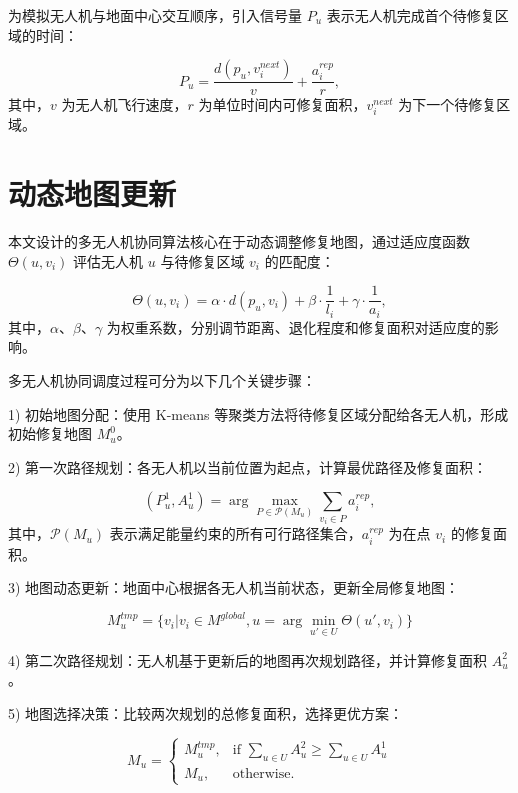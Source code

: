 为模拟无人机与地面中心交互顺序，引入信号量 $P_u$ 表示无人机完成首个待修复区域的时间：

\begin{equation}
	P_u = \frac{d(p_u, v_i^{next})}{v} + \frac{a_i^{rep}}{r},
\end{equation}
其中，$v$ 为无人机飞行速度，$r$ 为单位时间内可修复面积，$v_i^{next}$ 为下一个待修复区域。

\section{动态地图更新}

本文设计的多无人机协同算法核心在于动态调整修复地图，通过适应度函数 $\Theta(u,v_i)$ 评估无人机 $u$ 与待修复区域 $v_i$ 的匹配度：

\begin{equation}
	\Theta(u,v_i) = \alpha \cdot d(p_u, v_i) + \beta \cdot \frac{1}{l_i} + \gamma \cdot \frac{1}{a_i},
\end{equation}
其中，$\alpha$、$\beta$、$\gamma$ 为权重系数，分别调节距离、退化程度和修复面积对适应度的影响。

多无人机协同调度过程可分为以下几个关键步骤：

1) 初始地图分配：使用 K-means 等聚类方法将待修复区域分配给各无人机，形成初始修复地图 $M_u^0$。

2) 第一次路径规划：各无人机以当前位置为起点，计算最优路径及修复面积：

\begin{equation}
	(P_u^1, A_u^1) = \arg\max_{P \in \mathcal{P}(M_u)} \sum_{v_i \in P} a_i^{rep},
\end{equation}
其中，$\mathcal{P}(M_u)$ 表示满足能量约束的所有可行路径集合，$a_i^{rep}$ 为在点 $v_i$ 的修复面积。

3) 地图动态更新：地面中心根据各无人机当前状态，更新全局修复地图：

\begin{equation}
	M_u^{tmp} = \{v_i | v_i \in M^{global}, u = \arg\min_{u' \in U} \Theta(u',v_i)\}
\end{equation}

4) 第二次路径规划：无人机基于更新后的地图再次规划路径，并计算修复面积 $A_u^2$。

5) 地图选择决策：比较两次规划的总修复面积，选择更优方案：

\begin{equation}
	M_u =
	\begin{cases}
		M_u^{tmp}, & \text{if } \sum_{u \in U} A_u^2 \geq \sum_{u \in U} A_u^1 \\
		M_u,       & \text{otherwise}.
	\end{cases}
\end{equation}

